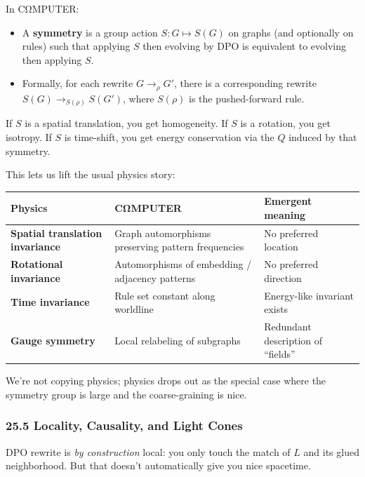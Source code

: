 In CΩMPUTER:

\begin{itemize}
  \item A \textbf{symmetry} is a group action $S: G \mapsto S(G)$ on graphs
        (and optionally on rules) such that applying $S$ then evolving by DPO
        is equivalent to evolving then applying $S$.

  \item Formally, for each rewrite $G \to_{\rho} G'$, there is a corresponding
        rewrite $S(G) \to_{S(\rho)} S(G')$, where $S(\rho)$ is the pushed-forward rule.
\end{itemize}

If $S$ is a spatial translation, you get homogeneity.  
If $S$ is a rotation, you get isotropy.  
If $S$ is time-shift, you get energy conservation via the $Q$ induced by that symmetry.

This lets us lift the usual physics story:

\begin{center}
\renewcommand{\arraystretch}{1.2}
\begin{tabularx}{\linewidth}{>{\bfseries}l X X}
\toprule
Physics & CΩMPUTER & Emergent meaning\\
\midrule
Spatial translation invariance & Graph automorphisms preserving pattern frequencies & No preferred location \\
Rotational invariance & Automorphisms of embedding / adjacency patterns & No preferred direction \\
Time invariance & Rule set constant along worldline & Energy-like invariant exists \\
Gauge symmetry & Local relabeling of subgraphs & Redundant description of “fields” \\
\bottomrule
\end{tabularx}
\end{center}

We’re not copying physics; physics drops out as the special case where the
symmetry group is large and the coarse-graining is nice.

\subsubsection*{25.5  Locality, Causality, and Light Cones}

DPO rewrite is \emph{by construction} local: you only touch the match of $L$
and its glued neighborhood. But that doesn’t automatically give you nice spacetime.

